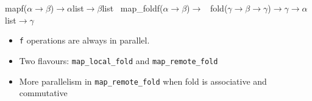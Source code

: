 \documentclass[xcolor=dvipsnames,8pt]{beamer}
\begin{document}
\begin{frame}
{{\begin{minipage}{\textwidth}
\noindent{}\hspace*{1.22ex}map\hspace*{1.22ex}f(\ensuremath{\alpha}\hspace*{1.22ex}\ensuremath{\rightarrow}\hspace*{1.22ex}\ensuremath{\beta})\hspace*{1.22ex}\ensuremath{\rightarrow}\hspace*{1.22ex}\ensuremath{\alpha}\hspace*{1.22ex}list\hspace*{1.22ex}\ensuremath{\rightarrow}\hspace*{1.22ex}\ensuremath{\beta}\hspace*{1.22ex}list~\linebreak
\noindent{}\hspace*{1.22ex}map\_{}fold\hspace*{1.22ex}f(\ensuremath{\alpha}\hspace*{1.22ex}\ensuremath{\rightarrow}\hspace*{1.22ex}\ensuremath{\beta})\hspace*{1.22ex}\ensuremath{\rightarrow}\hspace*{1.22ex}~\linebreak
\noindent\hspace*{8.00em}fold(\ensuremath{\gamma}\hspace*{1.22ex}\ensuremath{\rightarrow}\hspace*{1.22ex}\ensuremath{\beta}\hspace*{1.22ex}\ensuremath{\rightarrow}\hspace*{1.22ex}\ensuremath{\gamma})\hspace*{1.22ex}\ensuremath{\rightarrow}\hspace*{1.22ex}\ensuremath{\gamma}\hspace*{1.22ex}\ensuremath{\rightarrow}\hspace*{1.22ex}\ensuremath{\alpha}\hspace*{1.22ex}list\hspace*{1.22ex}\ensuremath{\rightarrow}\hspace*{1.22ex}\ensuremath{\gamma}
\end{minipage}}}


\medskip\noindent
  \begin{itemize}
  \item \texttt{f} operations are always in parallel.
  \item Two flavours: \texttt{map\_local\_fold} and
    \texttt{map\_remote\_fold}
  \item More parallelism in \texttt{map\_remote\_fold} when fold is
    associative and commutative
  \end{itemize}
  


\end{frame}
\end{document}
